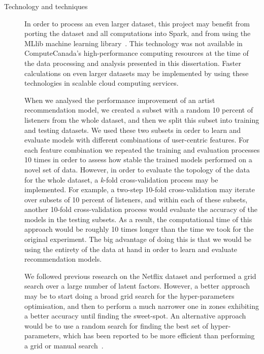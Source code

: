 \begin{description}
\item [Technology and techniques] In order to process an even larger dataset, this project may benefit from porting the dataset and all computations into Spark, and from using the MLlib machine learning library~\autocite{meng16mllib}. 
This technology was not available in ComputeCanada's high-performance computing resources at the time of the data processing and analysis presented in this dissertation. Faster calculations on even larger datasets may be implemented by using these technologies in scalable cloud computing services.

When we analysed the performance improvement of an artist recommendation model, we created a subset with a random 10 percent of listeners from the whole dataset, and then we split this subset into training and testing datasets. 
We used these two subsets in order to learn and evaluate models with different combinations of user-centric features. For each feature combination we repeated the training and evaluation processes 10 times in order to assess how stable the trained models performed on a novel set of data. 
However, in order to evaluate the topology of the data for the whole dataset, a \textit{k}-fold cross-validation process may be implemented. 
For example, a two-step 10-fold cross-validation may iterate over subsets of 10 percent of listeners, and within each of these subsets, another 10-fold cross-validation process would evaluate the accuracy of the models in the testing subsets. As a result, the computational time of this approach would be roughly 10 times longer than the time we took for the original experiment. The big advantage of doing this is that we would be using the entirety of the data at hand in order to learn and evaluate recommendation models.



We followed previous research on the Netflix dataset and performed a grid search over a large number of latent factors. However, a better approach may be to start doing a broad grid search for the hyper-parameters optimisation, and then to perform a much narrower one in zones exhibiting a better accuracy until finding the sweet-spot. An alternative approach would be to use a random search for finding the best set of hyper-parameters, which has been reported to be more efficient than performing a grid or manual search~\autocite{bergstra12random}.


\end{description}

